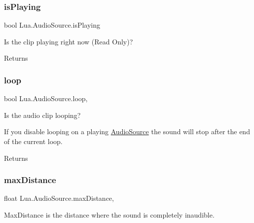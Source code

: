 \subsubsection{\texorpdfstring{isPlaying}{isPlaying}}
{\footnotesize\ttfamily bool Lua.\+Audio\+Source.\+is\+Playing\hspace{0.3cm}{\ttfamily [get]}}



Is the clip playing right now (Read Only)? 

\begin{DoxyReturn}{Returns}

\end{DoxyReturn}
\mbox{\label{class_lua_1_1_audio_source_a4ffd0dfe8f989efe964e368cc2a5995c}} 
\subsubsection{\texorpdfstring{loop}{loop}}
{\footnotesize\ttfamily bool Lua.\+Audio\+Source.\+loop\hspace{0.3cm}{\ttfamily [get]}, {\ttfamily [set]}}



Is the audio clip looping? 

If you disable looping on a playing \mbox{\hyperlink{class_lua_1_1_audio_source}{Audio\+Source}} the sound will stop after the end of the current loop. \begin{DoxyReturn}{Returns}

\end{DoxyReturn}
\mbox{\label{class_lua_1_1_audio_source_a55ad4d09380c973f2001b2164aba4771}} 
\subsubsection{\texorpdfstring{maxDistance}{maxDistance}}
{\footnotesize\ttfamily float Lua.\+Audio\+Source.\+max\+Distance\hspace{0.3cm}{\ttfamily [get]}, {\ttfamily [set]}}



Max\+Distance is the distance where the sound is completely inaudible. 

